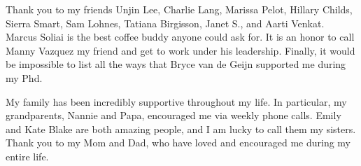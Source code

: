 Thank you to my friends Unjin Lee, Charlie Lang, Marissa Pelot, Hillary Childs, Sierra Smart, Sam Lohnes, Tatiana Birgisson, Janet S., and Aarti Venkat. Marcus Soliai is the best coffee buddy anyone could ask for. It is an honor to call Manny Vazquez my friend and get to work under his leadership. Finally, it would be impossible to list all the ways that Bryce van de Geijn supported me during my Phd. 


My family has been incredibly supportive throughout my life. In particular, my grandparents, Nannie and Papa, encouraged me via weekly phone calls. Emily and Kate Blake are both amazing people, and I am lucky to call them my sisters.  Thank you to my Mom and Dad, who have loved and encouraged me during my entire life. 